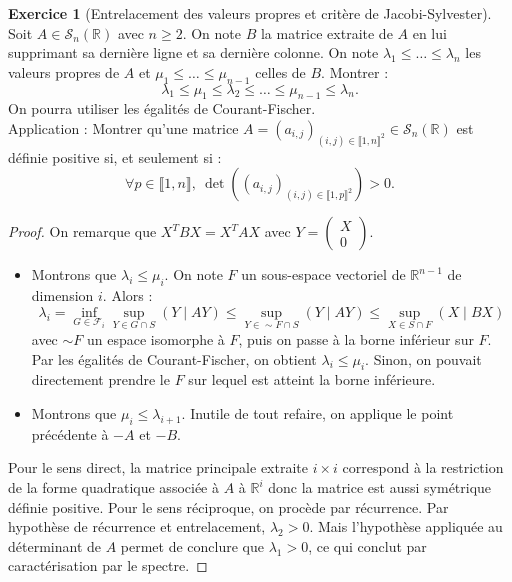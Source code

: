 \documentclass[french]{article}
\newcommand{\R}{\mathbb{R}}
\theoremstyle{definition}
\newtheorem{exo}{Exercice}
\begin{document}
\begin{exo}[Entrelacement des valeurs propres et critère de Jacobi-Sylvester]
	Soit $A\in\mathcal{S}_n(\R)$ avec $n\geqslant 2$. On note $B$ la matrice extraite de $A$ en lui supprimant sa dernière ligne et sa dernière colonne. On note $\lambda_1\leqslant\ldots\leqslant\lambda_n$ les valeurs propres de $A$ et $\mu_1\leqslant\ldots\leqslant\mu_{n-1}$ celles de $B$. Montrer : $$\lambda_1\leqslant\mu_1\leqslant\lambda_2\leqslant\ldots\leqslant\mu_{n-1}\leqslant\lambda_n.$$
	On pourra utiliser les égalités de Courant-Fischer.\\
	Application : Montrer qu'une matrice $A=(a_{i,j})_{(i,j)\in\llbracket1,n\rrbracket^2}\in\mathcal{S}_n(\R)$ est définie positive si, et seulement si :
	$$\forall p\in\llbracket1,n\rrbracket,\ \det((a_{i,j})_{(i,j)\in\llbracket1,p\rrbracket^2})>0.$$
\end{exo}
\begin{proof}
	On remarque que $X^TBX=X^TAX$ avec $Y=\begin{pmatrix}
		X\\0
	\end{pmatrix}$.
	\begin{itemize}
		\item Montrons que $\lambda_i\leqslant\mu_i$. On note $F$ un sous-espace vectoriel de $\R^{n-1}$ de dimension $i$. Alors :
		$$\lambda_i=\underset{G\in \mathcal{F}_i}{\inf}\underset{Y\in G\cap S}{\sup}(Y\mid AY)\leqslant\underset{Y\in \sim F\cap S}{\sup}(Y\mid AY)\leqslant\underset{X\in S\cap F}{\sup}(X\mid BX)$$ avec $\sim F$ un espace isomorphe à $F$, puis on passe à la borne inférieur sur $F$. Par les égalités de Courant-Fischer, on obtient $\lambda_i\leqslant\mu_i$. Sinon, on pouvait directement prendre le $F$ sur lequel est atteint la borne inférieure.
		\item Montrons que $\mu_i\leqslant\lambda_{i+1}$. Inutile de tout refaire, on applique le point précédente à $-A$ et $-B$. 
	\end{itemize}
	Pour le sens direct, la matrice principale extraite $i\times i$ correspond à la restriction de la forme quadratique associée à $A$ à $\R^i$ donc la matrice est aussi symétrique définie positive. Pour le sens réciproque, on procède par récurrence. Par hypothèse de récurrence et entrelacement, $\lambda_2>0$. Mais l'hypothèse appliquée au déterminant de $A$ permet de conclure que $\lambda_1>0$, ce qui conclut par caractérisation par le spectre.
\end{proof}
\end{document}
